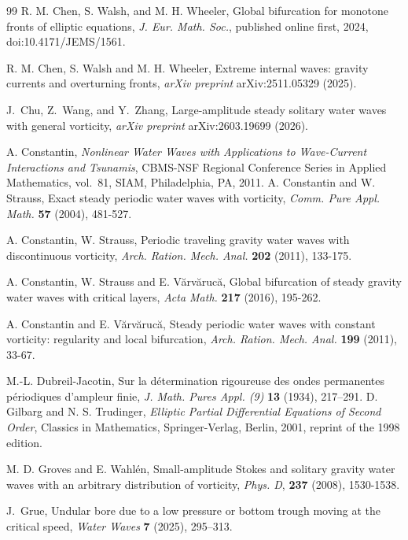 \documentclass[12pt,letterpaper]{amsart}
\numberwithin{equation}{section}
\begin{document}
\begin{thebibliography}{99}
R. M. Chen, S. Walsh, and M. H. Wheeler,
Global bifurcation for monotone fronts of elliptic equations,
\emph{J. Eur. Math. Soc.}, published online first, 2024,
doi:10.4171/JEMS/1561.

R. M. Chen, S. Walsh and M. H. Wheeler, Extreme internal waves: gravity currents and overturning fronts, \emph{arXiv preprint} arXiv:2511.05329 (2025).

J.~Chu, Z.~Wang, and Y.~Zhang,
Large-amplitude steady solitary water waves with general vorticity,
\emph{arXiv preprint} arXiv:2603.19699 (2026).

A. Constantin,
\emph{Nonlinear Water Waves with Applications to Wave-Current
	Interactions and Tsunamis},
CBMS-NSF Regional Conference Series in Applied Mathematics,
vol.~81, SIAM, Philadelphia, PA, 2011.
 A. Constantin and W. Strauss, Exact steady periodic water waves
with vorticity, \emph{Comm. Pure Appl. Math.} \textbf{57} (2004), 481-527.

 A. Constantin, W. Strauss, Periodic traveling gravity water waves with discontinuous vorticity, \emph{Arch. Ration. Mech. Anal.} \textbf{202} (2011), 133-175.


  A. Constantin, W. Strauss and E. V\u arv\u aruc\u a, Global bifurcation of steady
 gravity water waves with critical layers, \emph{Acta Math.} \textbf{217} (2016), 195-262.


 A. Constantin and E. V\u arv\u aruc\u a, Steady periodic water waves with
constant vorticity: regularity and local bifurcation, \emph{Arch. Ration. Mech. Anal.} \textbf{199} (2011), 33-67.

M.-L. Dubreil-Jacotin,
Sur la d\'etermination rigoureuse des ondes permanentes
p\'eriodiques d'ampleur finie,
\emph{J. Math. Pures Appl. (9)} \textbf{13} (1934), 217--291.
D. Gilbarg and N. S. Trudinger,
\emph{Elliptic Partial Differential Equations of Second Order},
Classics in Mathematics, Springer-Verlag, Berlin, 2001,
reprint of the 1998 edition.


 M. D. Groves and E. Wahl\'{e}n, Small-amplitude Stokes and solitary gravity water waves
with an arbitrary distribution of vorticity, \emph{Phys. D}, \textbf{237} (2008), 1530-1538.

J.~Grue,
Undular bore due to a low pressure or bottom trough moving at the critical speed,
\emph{Water Waves} \textbf{7} (2025), 295--313.


\end{thebibliography}
\end{document}
